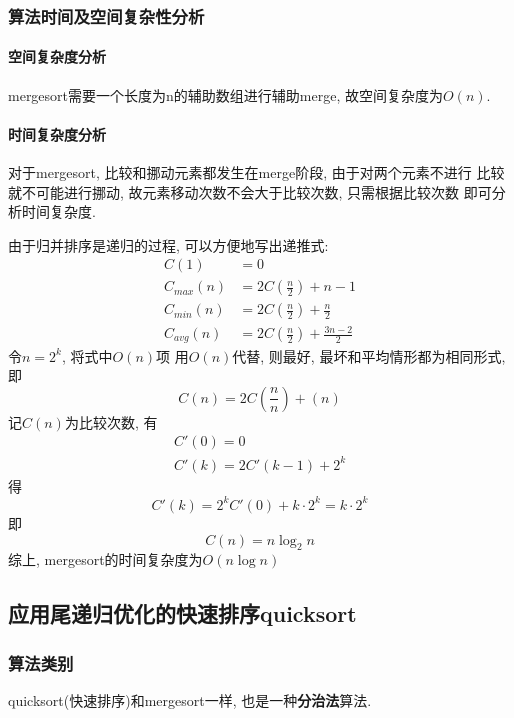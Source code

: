 \subsubsection{算法时间及空间复杂性分析}
\paragraph{空间复杂度分析}
mergesort需要一个长度为n的辅助数组进行辅助merge, 故空间复杂度为$O(n)$.

\paragraph{时间复杂度分析}
对于mergesort, 比较和挪动元素都发生在merge阶段, 由于对两个元素不进行
比较就不可能进行挪动, 故元素移动次数不会大于比较次数, 只需根据比较次数
即可分析时间复杂度. \par
由于归并排序是递归的过程, 可以方便地写出递推式:
\begin{align}
	C(1)       & = 0                                \nonumber \\
	C_{max}(n) & = 2C(\frac{n}{2}) + n-1            \nonumber \\
	C_{min}(n) & = 2C(\frac{n}{2}) + \frac{n}{2}    \nonumber \\
	C_{avg}(n) & = 2C(\frac{n}{2}) + \frac{3n-2}{2} \nonumber
\end{align}
令\(n=2^k\), 将式中$O(n)$项
用$O(n)$代替, 则最好, 最坏和平均情形都为相同形式, 即
\begin{equation}
	C(n) = 2C(\frac{n}{n})+(n)
\end{equation}
记$C(n)$为比较次数, 有
\begin{gather}
	C'(0) = 0            \nonumber \\
	C'(k) = 2C'(k-1)+2^k \nonumber
\end{gather}
得
\begin{equation}
	C'(k) = 2^kC'(0)+k\cdot 2^k = k\cdot 2^k \nonumber
\end{equation}
即
\begin{equation}
	C(n) = n\log_2{n} \nonumber
\end{equation}
综上, mergesort的时间复杂度为$O(n\log{n})$

\subsection{应用尾递归优化的快速排序quicksort}
\subsubsection{算法类别}
quicksort(快速排序)和mergesort一样, 也是一种\textbf{分治法}算法.

